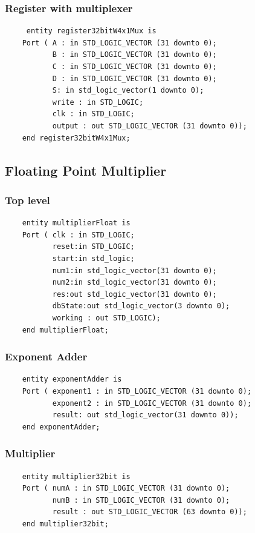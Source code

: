 \documentclass[a4paper,10pt]{article}
\begin{document}
    \subsubsection{Register with multiplexer}
    \begin{lstlisting}
     entity register32bitW4x1Mux is
    Port ( A : in STD_LOGIC_VECTOR (31 downto 0);
           B : in STD_LOGIC_VECTOR (31 downto 0);
           C : in STD_LOGIC_VECTOR (31 downto 0);
           D : in STD_LOGIC_VECTOR (31 downto 0);
           S: in std_logic_vector(1 downto 0);
           write : in STD_LOGIC;
           clk : in STD_LOGIC;
           output : out STD_LOGIC_VECTOR (31 downto 0));
    end register32bitW4x1Mux;
    \end{lstlisting}

    \newpage
    \subsection{Floating Point Multiplier}
    \label{sec:multiplier}
    \subsubsection{Top level}
    \begin{lstlisting}
    entity multiplierFloat is
    Port ( clk : in STD_LOGIC;
		   reset:in STD_LOGIC;
		   start:in std_logic;
		   num1:in std_logic_vector(31 downto 0);
		   num2:in std_logic_vector(31 downto 0);
		   res:out std_logic_vector(31 downto 0);
		   dbState:out std_logic_vector(3 downto 0);
		   working : out STD_LOGIC);
    end multiplierFloat;
    \end{lstlisting}

    \subsubsection{Exponent Adder}
    \begin{lstlisting}
    entity exponentAdder is
    Port ( exponent1 : in STD_LOGIC_VECTOR (31 downto 0);
           exponent2 : in STD_LOGIC_VECTOR (31 downto 0);
           result: out std_logic_vector(31 downto 0));
    end exponentAdder;
    \end{lstlisting}

    \subsubsection{Multiplier}
    \begin{lstlisting}
    entity multiplier32bit is
    Port ( numA : in STD_LOGIC_VECTOR (31 downto 0);
           numB : in STD_LOGIC_VECTOR (31 downto 0);
           result : out STD_LOGIC_VECTOR (63 downto 0));
    end multiplier32bit;
    \end{lstlisting}
\end{document}

